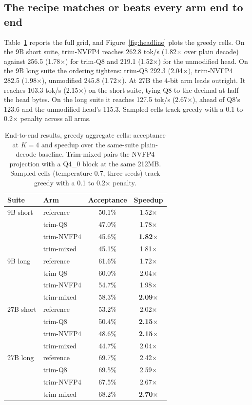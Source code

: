 \documentclass{article}
\newcommand{\x}{$\times$}
\begin{document}
\subsection{The recipe matches or beats every arm end to end}
\label{sec:e2e}

Table~\ref{tab:grid} reports the full grid, and Figure~\ref{fig:headline} plots the greedy cells. On the 9B short suite, trim-NVFP4 reaches 262.8 tok/s (1.82\x{} over plain decode) against 256.5 (1.78\x) for trim-Q8 and 219.1 (1.52\x) for the unmodified head. On the 9B long suite the ordering tightens: trim-Q8 292.3 (2.04\x), trim-NVFP4 282.5 (1.98\x), unmodified 245.8 (1.72\x). At 27B the 4-bit arm leads outright. It reaches 103.3 tok/s (2.15\x) on the short suite, tying Q8 to the decimal at half the head bytes. On the long suite it reaches 127.5 tok/s (2.67\x), ahead of Q8's 123.6 and the unmodified head's 115.3. Sampled cells track greedy with a 0.1 to 0.2\x{} penalty across all arms.

\begin{table}[t]
\caption{End-to-end results, greedy aggregate cells: acceptance at $K{=}4$ and speedup over the same-suite plain-decode baseline. Trim-mixed pairs the NVFP4 projection with a Q4\_0 block at the same 212MB. Sampled cells (temperature 0.7, three seeds) track greedy with a 0.1 to 0.2\x{} penalty.}
\label{tab:grid}
\vskip 0.1in
\centering
\small
\begin{tabular}{llcc}
\toprule
Suite & Arm & Acceptance & Speedup \\
\midrule
9B short  & reference   & 50.1\% & 1.52\x \\
          & trim-Q8     & 47.0\% & 1.78\x \\
          & trim-NVFP4  & 45.6\% & \textbf{1.82\x} \\
          & trim-mixed  & 45.1\% & 1.81\x \\
\midrule
9B long   & reference   & 61.6\% & 1.72\x \\
          & trim-Q8     & 60.0\% & 2.04\x \\
          & trim-NVFP4  & 54.7\% & 1.98\x \\
          & trim-mixed  & 58.3\% & \textbf{2.09\x} \\
\midrule
27B short & reference   & 53.2\% & 2.02\x \\
          & trim-Q8     & 50.4\% & \textbf{2.15\x} \\
          & trim-NVFP4  & 48.6\% & \textbf{2.15\x} \\
          & trim-mixed  & 44.7\% & 2.04\x \\
\midrule
27B long  & reference   & 69.7\% & 2.42\x \\
          & trim-Q8     & 69.5\% & 2.59\x \\
          & trim-NVFP4  & 67.5\% & 2.67\x \\
          & trim-mixed  & 68.2\% & \textbf{2.70\x} \\
\bottomrule
\end{tabular}
\end{table}
\end{document}
